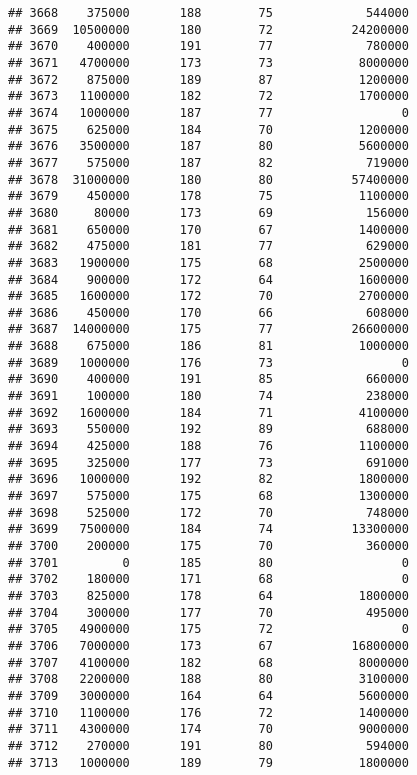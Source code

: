 \documentclass[
]{article}
\begin{document}
\begin{verbatim}
## 3668    375000       188        75             544000
## 3669  10500000       180        72           24200000
## 3670    400000       191        77             780000
## 3671   4700000       173        73            8000000
## 3672    875000       189        87            1200000
## 3673   1100000       182        72            1700000
## 3674   1000000       187        77                  0
## 3675    625000       184        70            1200000
## 3676   3500000       187        80            5600000
## 3677    575000       187        82             719000
## 3678  31000000       180        80           57400000
## 3679    450000       178        75            1100000
## 3680     80000       173        69             156000
## 3681    650000       170        67            1400000
## 3682    475000       181        77             629000
## 3683   1900000       175        68            2500000
## 3684    900000       172        64            1600000
## 3685   1600000       172        70            2700000
## 3686    450000       170        66             608000
## 3687  14000000       175        77           26600000
## 3688    675000       186        81            1000000
## 3689   1000000       176        73                  0
## 3690    400000       191        85             660000
## 3691    100000       180        74             238000
## 3692   1600000       184        71            4100000
## 3693    550000       192        89             688000
## 3694    425000       188        76            1100000
## 3695    325000       177        73             691000
## 3696   1000000       192        82            1800000
## 3697    575000       175        68            1300000
## 3698    525000       172        70             748000
## 3699   7500000       184        74           13300000
## 3700    200000       175        70             360000
## 3701         0       185        80                  0
## 3702    180000       171        68                  0
## 3703    825000       178        64            1800000
## 3704    300000       177        70             495000
## 3705   4900000       175        72                  0
## 3706   7000000       173        67           16800000
## 3707   4100000       182        68            8000000
## 3708   2200000       188        80            3100000
## 3709   3000000       164        64            5600000
## 3710   1100000       176        72            1400000
## 3711   4300000       174        70            9000000
## 3712    270000       191        80             594000
## 3713   1000000       189        79            1800000

\end{verbatim}
\end{document}
